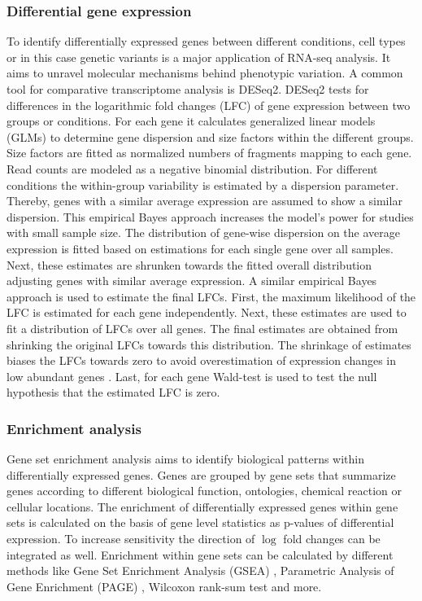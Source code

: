 \subsubsection{Differential gene expression}
To identify differentially expressed genes between different conditions, cell types or in this case genetic variants is a major application of RNA-seq analysis. It aims to unravel molecular mechanisms behind phenotypic variation. A common tool for comparative transcriptome analysis is DESeq2. DESeq2 tests for differences in the logarithmic fold changes (LFC) of gene expression between two groups or conditions. For each gene it calculates generalized linear models (GLMs) to determine gene dispersion and size factors within the different groups. Size factors are fitted as normalized numbers of fragments mapping to each gene. Read counts are modeled as a negative binomial distribution. For different conditions the within-group variability is estimated by a dispersion parameter. Thereby, genes with a similar average expression are assumed to show a similar dispersion. This empirical Bayes approach increases the model's power for studies with small sample size.
The distribution of gene-wise dispersion on the average expression is fitted based on estimations for each single gene over all samples. Next, these estimates are shrunken towards the fitted overall distribution adjusting genes with similar average expression. A similar empirical Bayes approach is used to estimate the final LFCs. First, the maximum likelihood of the LFC is estimated for each gene independently. Next, these estimates are used to fit a distribution of LFCs over all genes. The final estimates are obtained from shrinking the original LFCs towards this distribution. The shrinkage of estimates biases the LFCs towards zero to avoid overestimation of expression changes in low abundant genes \citep{Love2014}. Last, for each gene Wald-test \citep{Wald1945} is used to test the null hypothesis that the estimated LFC is zero.   


\subsubsection{Enrichment analysis}
Gene set enrichment analysis aims to identify biological patterns within differentially expressed genes. Genes are grouped by gene sets that summarize genes according to different biological function, ontologies, chemical reaction or cellular locations. The enrichment of differentially expressed genes within gene sets is calculated on the basis of gene level statistics as p-values of differential expression. To increase sensitivity the direction of $\log$ fold changes can be integrated as well. Enrichment within gene sets can be calculated by different methods like Gene Set Enrichment Analysis (GSEA) \citep{Subramanian2005}, Parametric Analysis of Gene Enrichment (PAGE) \citep{Kim2005}, Wilcoxon rank-sum test and more. 

